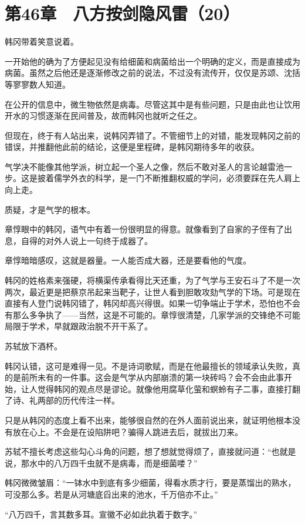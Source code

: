 \section{第46章　八方按剑隐风雷（20）}

韩冈带着笑意说着。

一开始他的确为了方便起见没有给细菌和病菌给出一个明确的定义，而是直接成为病菌。虽然之后他还是逐渐修改之前的说法，不过没有流传开，仅仅是苏颂、沈括等寥寥数人知道。

在公开的信息中，微生物依然是病毒。尽管这其中是有些问题，只是由此也让饮用开水的习惯逐渐在民间普及，故而韩冈也就听之任之。

但现在，终于有人站出来，说韩冈弄错了。不管细节上的对错，能发现韩冈之前的错误，并推翻他此前的结论，这便是里程碑，是韩冈期待多年的收获。

气学决不能像其他学派，树立起一个圣人之像，然后不敢对圣人的言论越雷池一步。这是披着儒学外衣的科学，是一门不断推翻权威的学问，必须要踩在先人肩上向上走。

质疑，才是气学的根本。

章惇眼中的韩冈，语气中有着一份很明显的得意。就像看到了自家的子侄有了出息，自得的对外人说上一句终于成器了。

章惇暗暗感叹，这就是器量。一人能否成大器，还是要看他的气度。

韩冈的姓格素来强硬，将横渠传承看得比天还重，为了气学与王安石斗了不是一次两次，最近更是把蔡京吊起来当靶子，让世人看到胆敢攻劾气学的下场。可是现在直接有人登门说韩冈错了，韩冈却高兴得很。如果一切争端止于学术，恐怕也不会有那么多争执了——当然，这是不可能的。章惇很清楚，几家学派的交锋绝不可能局限于学术，早就跟政治脱不开干系了。

苏轼放下酒杯。

韩冈认错，这可是难得一见。不是诗词歌赋，而是在他最擅长的领域承认失败，真的是前所未有的一件事。这会是气学从内部崩溃的第一块砖吗？会不会由此事开始，让人觉得韩冈的观点尽是谬论。就像他用腐草化萤和螟蛉有子二事，直接打翻了诗、礼两部的历代传注一样。

只是从韩冈的态度上看不出来，能够很自然的在外人面前说出来，就证明他根本没有放在心上。不会是在设陷阱吧？骗得人跳进去后，就拔出刀来。

苏轼不擅长考虑这些勾心斗角的问题，想了想就觉得烦了，直接就问道：“也就是说，那水中的八万四千虫就不是病毒，而是细菌喽？”

韩冈微微皱眉：“一钵水中到底有多少细菌，得看水质才行，要是蒸馏出的熟水，可没那么多。若是从河塘底舀出来的池水，千万倍亦不止。”

“八万四千，言其数多耳。宣徽不必如此执着于数字。”

